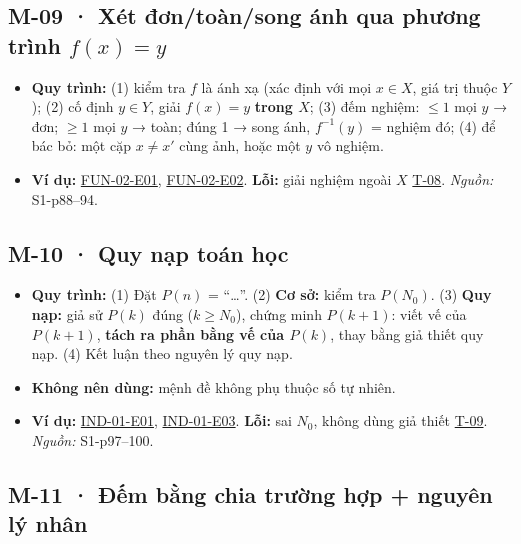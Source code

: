\documentclass[
  10pt,
  twoside,openany]{book}
\providecommand{\tightlist}{%
  \setlength{\itemsep}{0pt}\setlength{\parskip}{0pt}}
\begin{document}
\hypertarget{M-09}{%
\subsection{\texorpdfstring{M-09 · Xét đơn/toàn/song ánh qua phương
trình
\(f(x)=y\)}{M-09 · Xét đơn/toàn/song ánh qua phương trình f(x)=y}}\label{M-09}}

\begin{itemize}
\tightlist
\item
  \textbf{Quy trình:} (1) kiểm tra \(f\) là ánh xạ (xác định với mọi
  \(x\in X\), giá trị thuộc \(Y\)); (2) cố định \(y\in Y\), giải
  \(f(x)=y\) \textbf{trong \(X\)}; (3) đếm nghiệm: \(\le1\) mọi \(y\) →
  đơn; \(\ge1\) mọi \(y\) → toàn; đúng 1 → song ánh, \(f^{-1}(y)\) =
  nghiệm đó; (4) để bác bỏ: một cặp \(x\ne x'\) cùng ảnh, hoặc một \(y\)
  vô nghiệm.
\item
  \textbf{Ví dụ:} \protect\hyperlink{FUN-02-E01}{FUN-02-E01},
  \protect\hyperlink{FUN-02-E02}{FUN-02-E02}. \textbf{Lỗi:} giải nghiệm
  ngoài \(X\) \protect\hyperlink{T-08}{T-08}. \emph{Nguồn:} S1-p88--94.
\end{itemize}

\hypertarget{M-10}{%
\subsection{M-10 · Quy nạp toán học}\label{M-10}}

\begin{itemize}
\tightlist
\item
  \textbf{Quy trình:} (1) Đặt \(P(n)\) = ``\ldots{}''. (2) \textbf{Cơ
  sở:} kiểm tra \(P(N_0)\). (3) \textbf{Quy nạp:} giả sử \(P(k)\) đúng
  (\(k\ge N_0\)), chứng minh \(P(k+1)\): viết vế của \(P(k+1)\),
  \textbf{tách ra phần bằng vế của \(P(k)\)}, thay bằng giả thiết quy
  nạp. (4) Kết luận theo nguyên lý quy nạp.
\item
  \textbf{Không nên dùng:} mệnh đề không phụ thuộc số tự nhiên.
\item
  \textbf{Ví dụ:} \protect\hyperlink{IND-01-E01}{IND-01-E01},
  \protect\hyperlink{IND-01-E03}{IND-01-E03}. \textbf{Lỗi:} sai \(N_0\),
  không dùng giả thiết \protect\hyperlink{T-09}{T-09}. \emph{Nguồn:}
  S1-p97--100.
\end{itemize}

\hypertarget{M-11}{%
\subsection{M-11 · Đếm bằng chia trường hợp + nguyên lý
nhân}\label{M-11}}
\end{document}
